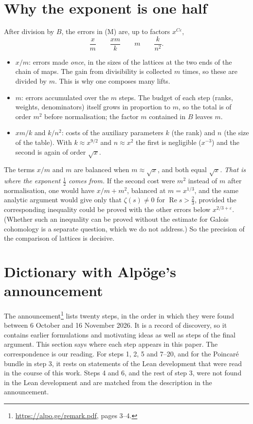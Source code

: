 \documentclass[11pt,letterpaper]{article}
\newcommand{\re}{\operatorname{Re}}
\begin{document}
\section{Why the exponent is one half}

After division by $B$, the errors in (M) are, up to factors $x^{C\varepsilon}$,
\begin{equation}\label{D:35}
 \frac xm\qquad\frac{xm}{k}\qquad m\qquad\frac k{n^2}.
\end{equation}
\begin{itemize}
\item $x/m$: errors made \emph{once}, in the sizes of the lattices at the two ends of the chain of maps. The gain from divisibility
is collected $m$ times, so these are divided by $m$. This is why one composes many lifts.
\item $m$: errors accumulated over the $m$ steps. The budget of each step (ranks, weights, denominators) itself grows in proportion to $m$, so the total is of order $m^2$ before normalisation; the factor $m$ contained in $B$ leaves $m$.
\item $xm/k$ and $k/n^2$: costs of the auxiliary parameters $k$ (the rank) and $n$ (the size of the table).
With $k\approx x^{9/2}$ and $n\approx x^2$ the first is negligible ($x^{-3}$) and the second is again of
order $\sqrt x$.
\end{itemize}
The terms $x/m$ and $m$ are balanced when $m\approx\sqrt x$, and both equal $\sqrt x$. \emph{That is where the
exponent $\frac12$ comes from.} If the second cost were $m^2$ instead of $m$ after normalisation, one would have $x/m+m^2$, balanced at
$m=x^{1/3}$, and the same analytic argument would give only that $\zeta(s)\ne0$ for $\re s>\frac23$, provided the corresponding inequality could be proved with the other errors below $x^{2/3+\varepsilon}$. (Whether such an inequality can be proved without the estimate for Galois cohomology is a separate question, which we do not address.) So the precision of
the comparison of lattices is decisive.

\section{Dictionary with Alp\"oge's announcement}

The announcement\footnote{\url{https://alpo.ge/remark.pdf}, pages 3--4.} lists twenty steps, in the order in
which they were found between 6 October and 16 November 2026. It is a record of discovery, so it contains
earlier formulations and motivating ideas as well as steps of the final argument. This section says where
each step appears in this paper. The correspondence is our reading. For steps 1, 2, 5 and 7--20, and for the Poincar\'e bundle in step 3,
it rests on statements of the Lean development that were read in the course of this work. Steps 4 and 6,
and the rest of step 3, were not found in the Lean development and are matched from the description in the
announcement.
\end{document}
